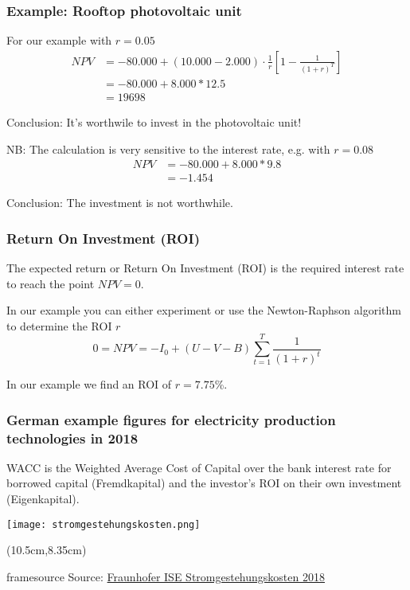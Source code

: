 \documentclass[10pt,aspectratio=169,dvipsnames]{beamer}
\newcommand{\source}[1]{\begin{textblock*}{5cm}(10.5cm,8.35cm)
    \begin{beamercolorbox}[ht=0.5cm,right]{framesource}
        \usebeamerfont{framesource}\usebeamercolor[fg]{framesource} Source: {#1}
    \end{beamercolorbox}
\end{textblock*}}
\begin{document}
\begin{frame}
  \frametitle{Example: Rooftop photovoltaic unit}

  For our example with $r= 0.05$
  \begin{align*}
    NPV & = -80.000 + (10.000 - 2.000)  \cdot \frac{1}{r} \left[1  - \frac{1}{(1+r)^{T}}  \right] \\
    & = -80.000 + 8.000*12.5 \\
    & = 19698
  \end{align*}

  \alert{Conclusion:} It's worthwile to invest in the photovoltaic unit!

  \pause

  NB: The calculation is very sensitive to the interest rate, e.g. with $r = 0.08$
  \begin{align*}
    NPV & = -80.000 + 8.000*9.8 \\
    & = -1.454
  \end{align*}

  \alert{Conclusion:} The investment is not worthwhile.

\end{frame}

\begin{frame}
  \frametitle{Return On Investment (ROI)}

  The expected return or \alert{Return On Investment (ROI)} is the required interest rate to reach the point $NPV = 0$.

  In our example you can either experiment or use the Newton-Raphson algorithm to determine the ROI $r$
  \begin{equation*}
    0 = NPV = -I_0 + (U - V - B) \sum_{t=1}^T \frac{1}{(1+r)^t}
  \end{equation*}

  In our example we find an ROI of $r=7.75$\%.

\end{frame}



\begin{frame}
  \frametitle{German example figures for electricity production technologies in 2018}

  WACC is the \alert{Weighted Average Cost of Capital} over the bank interest rate for borrowed capital (Fremdkapital) and the investor's ROI on their own investment (Eigenkapital).

  \centering
  \texttt{[image: stromgestehungskosten.png]}


  \source{\href{https://www.ise.fraunhofer.de/content/dam/ise/de/documents/publications/studies/DE2018_ISE_Studie_Stromgestehungskosten_Erneuerbare_Energien.pdf}{Fraunhofer ISE Stromgestehungskosten 2018}}

\end{frame}
\end{document}
